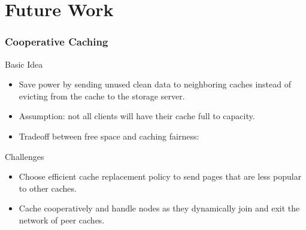 \documentclass{beamer}
\begin{document}
\section{Future Work}
%
\begin{frame}
    \frametitle{Cooperative Caching}
    \begin{block}{Basic Idea}
	\begin{itemize}
	    \item Save power by sending unused clean data to neighboring caches
		instead of evicting from the cache to the storage server.
	    \item Assumption: not all clients will have their cache full to capacity.
	    \item Tradeoff between free space and caching fairness:
	    \vspace{5pt}
	\end{itemize}
    \end{block}
    \begin{block}{Challenges}
	\begin{itemize}
	    \item Choose efficient cache replacement policy to
		send pages that are less popular to other caches.
	    \item Cache cooperatively and handle nodes as they dynamically
		join and exit the network of peer caches.
	\end{itemize}
    \end{block}
\end{frame}
%
%
%
%
%
%
\end{document}
